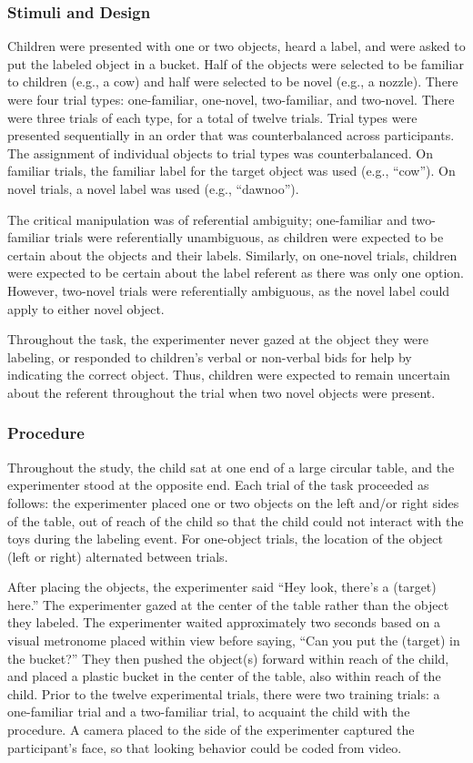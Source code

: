 \documentclass[a4paper,man,apacite,floatsintext]{apa6}
\begin{document}
\subsubsection{Stimuli and Design}\label{stimuli-and-design}

Children were presented with one or two objects, heard a label, and were
asked to put the labeled object in a bucket. Half of the objects were
selected to be familiar to children (e.g., a cow) and half were selected
to be novel (e.g., a nozzle). There were four trial types: one-familiar,
one-novel, two-familiar, and two-novel. There were three trials of each
type, for a total of twelve trials. Trial types were presented
sequentially in an order that was counterbalanced across participants.
The assignment of individual objects to trial types was counterbalanced.
On familiar trials, the familiar label for the target object was used
(e.g., ``cow''). On novel trials, a novel label was used (e.g.,
``dawnoo'').

The critical manipulation was of referential ambiguity; one-familiar and
two-familiar trials were referentially unambiguous, as children were
expected to be certain about the objects and their labels. Similarly, on
one-novel trials, children were expected to be certain about the label
referent as there was only one option. However, two-novel trials were
referentially ambiguous, as the novel label could apply to either novel
object.

Throughout the task, the experimenter never gazed at the object they
were labeling, or responded to children's verbal or non-verbal bids for
help by indicating the correct object. Thus, children were expected to
remain uncertain about the referent throughout the trial when two novel
objects were present.

\subsubsection{Procedure}\label{procedure}

Throughout the study, the child sat at one end of a large circular
table, and the experimenter stood at the opposite end. Each trial of the
task proceeded as follows: the experimenter placed one or two objects on
the left and/or right sides of the table, out of reach of the child so
that the child could not interact with the toys during the labeling
event. For one-object trials, the location of the object (left or right)
alternated between trials.

After placing the objects, the experimenter said ``Hey look, there's a
(target) here.'' The experimenter gazed at the center of the table
rather than the object they labeled. The experimenter waited
approximately two seconds based on a visual metronome placed within view
before saying, ``Can you put the (target) in the bucket?'' They then
pushed the object(s) forward within reach of the child, and placed a
plastic bucket in the center of the table, also within reach of the
child. Prior to the twelve experimental trials, there were two training
trials: a one-familiar trial and a two-familiar trial, to acquaint the
child with the procedure. A camera placed to the side of the
experimenter captured the participant's face, so that looking behavior
could be coded from video.
\end{document}
